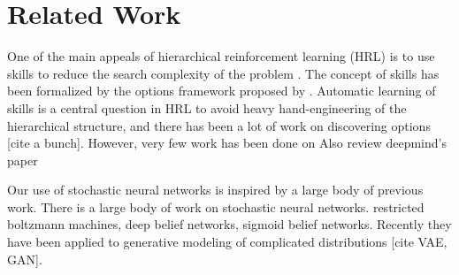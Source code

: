 \documentclass{article} %
\begin{document}





\section{Related Work}



One of the main appeals of hierarchical reinforcement learning (HRL) is to use skills to reduce the search complexity of the problem \citep{parr1998reinforcement, sutton1999between, dietterich2000hierarchical}. The concept of skills has been formalized by the options framework proposed by \cite{sutton1999between}. Automatic learning of skills is a central question in HRL to avoid heavy hand-engineering of the hierarchical structure, and there has been a lot of work on discovering options [cite a bunch]. However, very few work has been done on Also review
deepmind's paper%


Our use of stochastic neural networks is inspired by a large body of previous work.
There is a large body of work on stochastic neural networks.  restricted boltzmann machines, deep belief networks, sigmoid belief networks. Recently they have been applied to generative modeling of complicated distributions [cite VAE, GAN].
\end{document}
